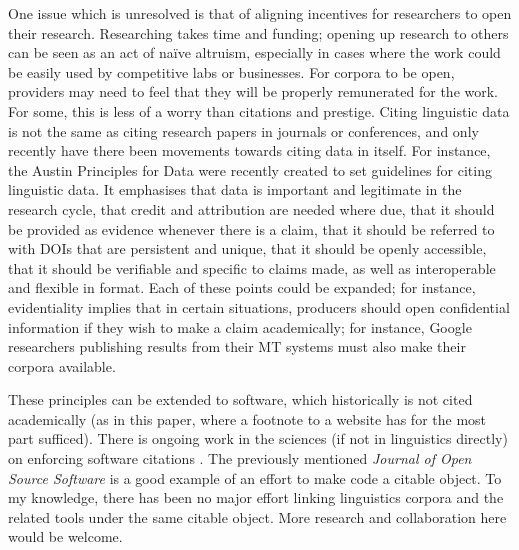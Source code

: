 One issue which is unresolved is that of aligning incentives for researchers to open their research. Researching takes time and funding; opening up research to others can be seen as an act of na\"{i}ve altruism, especially in cases where the work could be easily used by competitive labs or businesses. For corpora to be open, providers may need to feel that they will be properly remunerated for the work. For some, this is less of a worry than citations and prestige. Citing linguistic data is not the same as citing research papers in journals or conferences, and only recently have there been movements towards citing data in itself. For instance, the Austin Principles for Data \citep{AustinPrinciples2017} were recently created to set guidelines for citing linguistic data. It emphasises that data is important and legitimate in the research cycle, that credit and attribution are needed where due, that it should be provided as evidence whenever there is a claim, that it should be referred to with DOIs that are persistent and unique, that it should be openly accessible, that it should be verifiable and specific to claims made, as well as interoperable and flexible in format. Each of these points could be expanded; for instance, evidentiality implies that in certain situations, producers should open confidential information if they wish to make a claim academically; for instance, Google researchers publishing results from their MT systems must also make their corpora available.

These principles can be extended to software, which historically is not cited academically (as in this paper, where a footnote to a website has for the most part sufficed). There is ongoing work in the sciences (if not in linguistics directly) on enforcing software citations \citep{DBLP:journals/corr/KatzCWHVHSJCCVL15, katz2016report}. The previously mentioned {\it Journal of Open Source Software} \citep{smith2018journal} is a good example of an effort to make code a citable object. To my knowledge, there has been no major effort linking linguistics corpora and the related tools under the same citable object. More research and collaboration here would be welcome.

